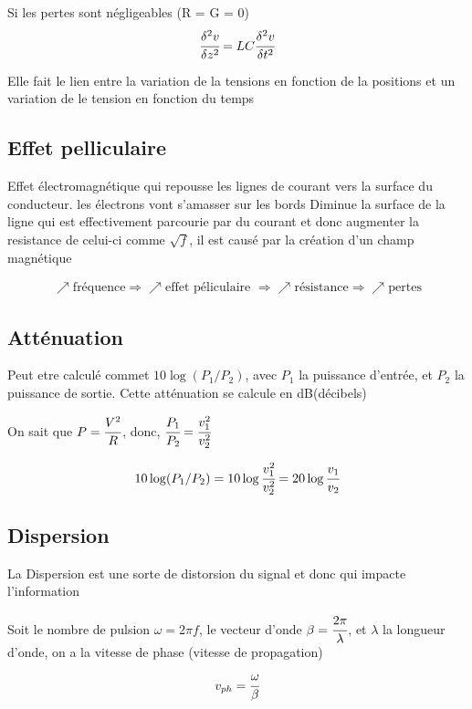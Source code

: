 \documentclass[12pt]{article}
\begin{document}
		Si les pertes sont négligeables (R = G = 0)
		\begin{equation}
			\cfrac{\delta^2 v}{\delta z^2} = LC\cfrac{\delta^2 v}{\delta t^2}
		\end{equation}
		
		Elle fait le lien entre la variation de la tensions en fonction de la positions et un variation de le tension en fonction du temps
		
		
	\subsection{Effet pelliculaire}
		Effet électromagnétique qui repousse les lignes de courant  vers la surface du conducteur. les électrons vont s'amasser sur les bords
		Diminue la surface de la ligne qui est effectivement parcourie par du courant et donc augmenter la resistance de celui-ci comme $\sqrt{f}$, il est causé par la création d'un champ magnétique
		
		\begin{align*}
			\nearrow \text{fréquence} \Rightarrow \nearrow \text{effet péliculaire }\Rightarrow \nearrow \text{résistance} \Rightarrow \nearrow \text{pertes}
		\end{align*}
			
	\subsection{Atténuation}
		Peut etre calculé commet $10\log(P_{1}/P_{2})$, avec $P_1$ la puissance d'entrée, et $P_2$ la puissance de sortie. Cette atténuation se calcule en dB(décibels)
		
		On sait que $P = \cfrac{V^2}{R}$, donc, $\cfrac{P_1}{P_2} = \cfrac{v_{1}^{2}}{v_{2}^{2}}$
		
		\begin{equation}
			10\log(P_{1}/P_{2}) = 10\log\cfrac{v_{1}^{2}}{v_{2}^{2}} = 20\log\cfrac{v_{1}}{v_{2}}
		\end{equation}
		
	\subsection{Dispersion}
		La Dispersion est une sorte de distorsion du signal et donc qui impacte l'information
		
		Soit le nombre de pulsion $\omega = 2 \pi f$, le vecteur d'onde $\beta = \cfrac{2\pi}{\lambda}$, et $\lambda$ la longueur d'onde, on a la vitesse de phase (vitesse de propagation)
		\begin{equation}
			v_{ph} = \cfrac{\omega}{\beta}
		\end{equation}
		
\end{document}
